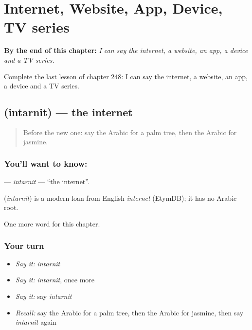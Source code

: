 
\chapter{Internet, Website, App, Device, TV series}
\label{ch:ar-internet-website-app-device-tv-series}

\begin{chapteropening}
\textbf{By the end of this chapter:} \emph{I can say the internet, a website, an app, a device and a TV series.}

Complete the last lesson of chapter 248: I can say the internet, a website, an app, a device and a TV series.
\end{chapteropening}

\section[\texorpdfstring{\ar{إنترنت} (intarnit)}{إنترنت (intarnit)}]{ (intarnit) — the internet}

\label{lesson:AR-C248-intarnit}



\begin{quote}
Before the new one: say the Arabic for a palm tree, then the Arabic for jasmine.
\end{quote}

\subsection*{You'll want to know: }
\textbf{} — \emph{intarnit} — \textquotedblleft{}the internet\textquotedblright{}.

\begin{cousinweb}
\textbf{} (\emph{intarnit}) is a modern loan from English \emph{internet} (EtymDB); it has no Arabic root.
\end{cousinweb}

\begin{grammarlens}[title={What you've built}]
One more word for this chapter.
\end{grammarlens}

\subsection*{Your turn}
\begin{itemize}
\raggedright
  \item \emph{Say it:} \emph{intarnit}
  \item \emph{Say it:} \emph{intarnit}, once more
  \item \emph{Say it:} say \emph{intarnit}
  \item \emph{Recall:} say the Arabic for a palm tree, then the Arabic for jasmine, then say \emph{intarnit} again
\end{itemize}

